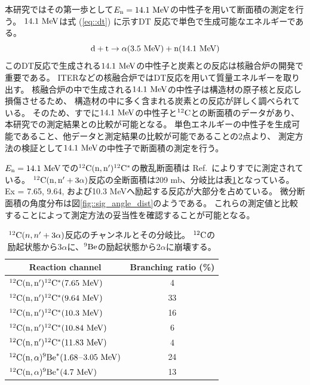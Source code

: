 本研究ではその第一歩として$E_{\rm n} = 14.1~{\rm MeV}$の中性子を用いて断面積の測定を行う。
$14.1~{\rm MeV}$は式 (\ref{eq::dt}) に示すDT 反応で単色で生成可能なエネルギーである。
\begin{equation}
  {\rm d} + {\rm t} \rightarrow \alpha (3.5~{\rm MeV}) + {\rm n} (14.1~{\rm MeV})
  \label{eq::dt}
\end{equation}
このDT反応で生成される$14.1~{\rm MeV}$の中性子と炭素との反応は核融合炉の開発で重要である。
ITERなどの核融合炉ではDT反応を用いて質量エネルギーを取り出す。
核融合炉の中で生成される$14.1~{\rm MeV}$の中性子は構造材の原子核と反応し損傷させるため、
構造材の中に多く含まれる炭素との反応が詳しく調べられている。
そのため、すでに$14.1~{\rm MeV}$の中性子と${}^{12}{\rm C}$との断面積のデータがあり、本研究での測定結果との比較が可能となる。
単色エネルギーの中性子を生成可能であること、他データと測定結果の比較が可能であることの2点より、
測定方法の検証として$14.1~{\rm MeV}$の中性子で断面積の測定を行う。

$E_{\rm n}=14.1~{\rm MeV}$での${}^{12}{\rm C}({\rm n},{\rm n}'){}^{12}{\rm C}^{*}$の散乱断面積は
Ref.~\cite{takahashietal,kondoetal}によりすでに測定されている。
${}^{12}{\rm C}({\rm n},{\rm n}'+3\alpha)$反応の全断面積は209 mb、分岐比は表\ref{tab::branchingratio}となっている。
Ex = 7.65, 9.64, および10.3 MeVへ励起する反応が大部分を占めている。
微分断面積の角度分布は図\ref{fig::sig_angle_dist}のようである。
これらの測定値と比較することによって測定方法の妥当性を確認することが可能となる。

\begin{table}
  \centering
  \caption[${}^{12}{\rm C}(n,n'+3\alpha)$反応のチャンネルとその分岐比。]
          {${}^{12}{\rm C}(n,n'+3\alpha)$反応のチャンネルとその分岐比。
  ${}^{12}{\rm C}$の励起状態から$3\alpha$に、${}^{9}{\rm Be}$の励起状態から$2\alpha$に崩壊する。}
  \label{tab::branchingratio}
  \begin{tabular}{lc}
    \toprule
    \multicolumn{1}{c}{Reaction channel} & Branching ratio (\%)\\
    \midrule
    ${}^{12}{\rm C}({\rm n},{\rm n}'){}^{12}{\rm C}^{*}(7.65~{\rm MeV})$ & 4\\
    ${}^{12}{\rm C}({\rm n},{\rm n}'){}^{12}{\rm C}^{*}(9.64~{\rm MeV})$ & 33\\
    ${}^{12}{\rm C}({\rm n},{\rm n}'){}^{12}{\rm C}^{*}(10.3~{\rm MeV})$ & 16\\
    ${}^{12}{\rm C}({\rm n},{\rm n}'){}^{12}{\rm C}^{*}(10.84~{\rm MeV})$ & 6\\
    ${}^{12}{\rm C}({\rm n},{\rm n}'){}^{12}{\rm C}^{*}(11.83~{\rm MeV})$ & 4\\
    ${}^{12}{\rm C}({\rm n},\alpha){}^{9}{\rm Be}^{*}(1.68$--$3.05~{\rm MeV})$ & 24\\
    ${}^{12}{\rm C}({\rm n},\alpha){}^{9}{\rm Be}^{*}(4.7~{\rm MeV})$ & 13\\
    \bottomrule
  \end{tabular}
\end{table}

